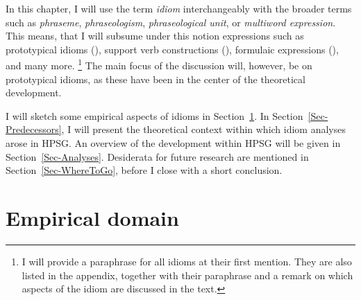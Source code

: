 \documentclass[output=paper
	        ,collection
	        ,collectionchapter
 	        ,biblatex
                ,babelshorthands
                ,newtxmath
                ,draftmode
                ,colorlinks, citecolor=brown
]{langscibook}
\begin{document}
In this chapter, I will use the term \emph{idiom} interchangeably with the broader terms such as \emph{phraseme}, \emph{phraseologism}, \emph{phraseological unit}, or \emph{multiword expression}. This means, that I will subsume under this notion expressions such as prototypical idioms (), support verb constructions (), formulaic expressions (), and many more.%
\footnote{I will provide a paraphrase for all idioms at their first mention. They are also listed in the appendix, together with their paraphrase and a remark on which aspects of the idiom are discussed in the text.}
The main focus of the discussion will, however, be on prototypical idioms, as these have been in the center of the theoretical development.

I will sketch some empirical aspects of idioms in Section~\ref{Sec-EmpiricalDomain}.
In Section~\ref{Sec-Predecessors}, I will present the theoretical context within which idiom analyses arose in HPSG.
An overview of the development within HPSG will be given in Section~\ref{Sec-Analyses}. 
Desiderata for future research are mentioned in Section~\ref{Sec-WhereToGo}, before I close with a short conclusion.

\section{Empirical domain}
\label{Sec-EmpiricalDomain}

\end{document}
